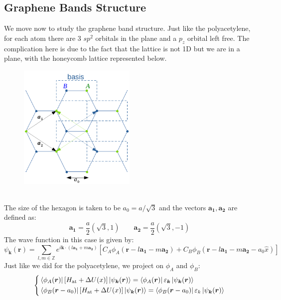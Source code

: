 \documentclass[10.75pt,a4paper,openright,bottom=2cm]{article}
\renewcommand{\Vec}[1]{\boldsymbol{#1}}
\begin{document}
\subsection{Graphene Bands Structure}
We move now to study the graphene band structure. Just like the polyacetylene, for each atom there are 3 $sp^2$ orbitals in the plane and a $p_z$ orbital left free. The complication here is due to the fact that the lattice is not 1D but we are in a plane, with the honeycomb lattice represented below.
\begin{figure}[h]
    \centering
    \includegraphics[width=0.5\textwidth]{graphenescheme.pdf}
    \label{fig:graphenescheme}
\end{figure}\\
\noindent
The size of the hexagon is taken to be $a_0=a/\sqrt{3}$ and the vectors $\Vec{a_1}, \Vec{a_2}$ are defined as:
\[
\Vec{a_1}=\frac{a}{2}(\sqrt{3},1) \qquad \Vec{a_2}=\frac{a}{2}(\sqrt{3},-1)
\]
The wave function in this case is given by:
\[
\psi_{\Vec{k}}(\Vec{r})=\sum_{l,m\in\mathbb{Z}}e^{i\Vec{k}\cdot(l\Vec{a_1}+m\Vec{a_2})}[C_A\phi_A(\Vec{r}-l\Vec{a_1}-m\Vec{a_2})+C_B\phi_B(\Vec{r}-l\Vec{a_1}-m\Vec{a_2}-a_0\hat{x})]
\]
Just like we did for the polyacetylene, we project on $\phi_A$ and $\phi_B$:
\[
\left\{
\begin{aligned}
&\bra{\phi_A(\Vec{r})}[H_{\text{at}}+\Delta U(x)]\ket{\psi_{\Vec{k}}(\Vec{r})}=\bra{\phi_A(\Vec{r})}\varepsilon_{\Vec{k}}\ket{\psi_{\Vec{k}}(\Vec{r})}\\
&\bra{\phi_B(\Vec{r}-a_0)}[H_{\text{at}}+\Delta U(x)]\ket{\psi_{\Vec{k}}(\Vec{r})}=\bra{\phi_B(\Vec{r}-a_0)}\varepsilon_k\ket{\psi_{\Vec{k}}(\Vec{r})}
\end{aligned}
\right.
\]
\end{document}
